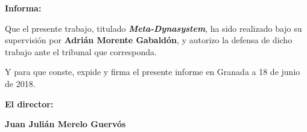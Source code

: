 \vspace{0.5cm}

\textbf{Informa:}

\vspace{0.5cm}

Que el presente trabajo, titulado \textit{\textbf{Meta-Dynasystem}}, ha sido realizado bajo su supervisión por \textbf{Adrián Morente Gabaldón}, y autorizo la defensa de dicho trabajo ante el tribunal que corresponda.

\vspace{0.5cm}

Y para que conste, expide y firma el presente informe en Granada a 18 de junio de 2018.

\vspace{1cm}

\textbf{El director:}

\vspace{5cm}

\noindent \textbf{Juan Julián Merelo Guervós}
